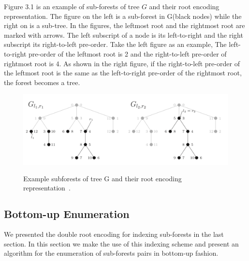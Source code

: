 Figure 3.1 is an example of sub-forests of tree $G$ and their root encoding representation. The figure on the left is a sub-forest in G(black nodes) while the right on is a sub-tree. In the figures, the leftmost root and the rightmost root are marked with arrows. The left subscript of a node is its left-to-right and the right subscript its right-to-left pre-order. Take the left figure as an example, The left-to-right pre-order of the leftmost root is 2 and the right-to-left pre-order of rightmost root is 4. As shown in the right figure, if the right-to-left pre-order of the leftmost root is the same as the left-to-right pre-order of the rightmost root, the forest becomes a tree.

\begin{figure}
		\centering
		\includegraphics[width=14cm,clip]{Figures/RootEncoding}
		\label{Example subforests of tree G and their root encoding representation} 
		\caption{Example subforests of tree G and their root encoding representation~\cite{pawlik2015efficient}.}
\end{figure}
\subsection{Bottom-up Enumeration}
We presented the double root encoding for indexing sub-forests in the last section. In this section we make the use of this indexing scheme and present an algorithm for the enumeration of sub-forests pairs in bottom-up fashion.


